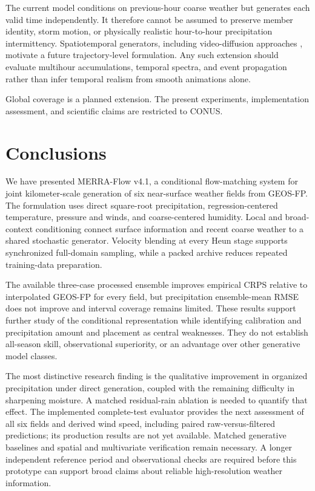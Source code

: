 \documentclass[10pt]{article}
\newcommand{\model}{MERRA-Flow}
\begin{document}
The current model conditions on previous-hour coarse weather but generates each valid time independently. It therefore cannot be assumed to preserve member identity, storm motion, or physically realistic hour-to-hour precipitation intermittency. Spatiotemporal generators, including video-diffusion approaches \citep{srivastava2024}, motivate a future trajectory-level formulation. Any such extension should evaluate multihour accumulations, temporal spectra, and event propagation rather than infer temporal realism from smooth animations alone.

Global coverage is a planned extension. The present experiments, implementation assessment, and scientific claims are restricted to CONUS.

\section{Conclusions}\label{sec:conclusion}
We have presented \model{} v4.1, a conditional flow-matching system for joint kilometer-scale generation of six near-surface weather fields from GEOS-FP. The formulation uses direct square-root precipitation, regression-centered temperature, pressure and winds, and coarse-centered humidity. Local and broad-context conditioning connect surface information and recent coarse weather to a shared stochastic generator. Velocity blending at every Heun stage supports synchronized full-domain sampling, while a packed archive reduces repeated training-data preparation.

The available three-case processed ensemble improves empirical CRPS relative to interpolated GEOS-FP for every field, but precipitation ensemble-mean RMSE does not improve and interval coverage remains limited. These results support further study of the conditional representation while identifying calibration and precipitation amount and placement as central weaknesses. They do not establish all-season skill, observational superiority, or an advantage over other generative model classes.

The most distinctive research finding is the qualitative improvement in organized precipitation under direct generation, coupled with the remaining difficulty in sharpening moisture. A matched residual-rain ablation is needed to quantify that effect. The implemented complete-test evaluator provides the next assessment of all six fields and derived wind speed, including paired raw-versus-filtered predictions; its production results are not yet available. Matched generative baselines and spatial and multivariate verification remain necessary. A longer independent reference period and observational checks are required before this prototype can support broad claims about reliable high-resolution weather information.
\end{document}
